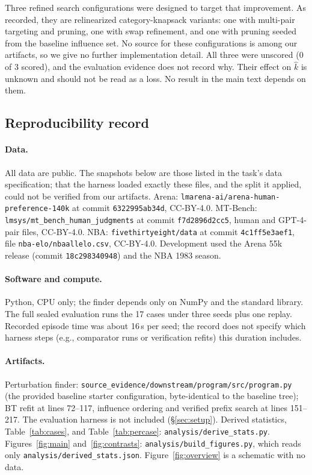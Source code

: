 \documentclass{article}
\newcommand{\kver}{\hat{k}}
\begin{document}
Three refined search configurations were designed to target that improvement. As recorded, they are relinearized category-knapsack variants: one with multi-pair targeting and pruning, one with swap refinement, and one with pruning seeded from the baseline influence set. No source for these configurations is among our artifacts, so we give no further implementation detail. All three were unscored (0 of 3 scored), and the evaluation evidence does not record why. Their effect on $\kver$ is unknown and should not be read as a loss. No result in the main text depends on them.

\subsection{Reproducibility record}
\label{app:repro}

\paragraph{Data.}
All data are public. The snapshots below are those listed in the task's data specification; that the harness loaded exactly these files, and the split it applied, could not be verified from our artifacts. Arena: \nolinkurl{lmarena-ai/arena-human-preference-140k} at commit \texttt{6322995ab34d}, CC-BY-4.0. MT-Bench: \nolinkurl{lmsys/mt_bench_human_judgments} at commit \texttt{f7d2896d2cc5}, human and GPT-4-pair files, CC-BY-4.0. NBA: \nolinkurl{fivethirtyeight/data} at commit \texttt{4c1ff5e3aef1}, file \nolinkurl{nba-elo/nbaallelo.csv}, CC-BY-4.0. Development used the Arena 55k release (commit \texttt{18c298340948}) and the NBA 1983 season.

\paragraph{Software and compute.}
Python, CPU only; the finder depends only on NumPy and the standard library. The full sealed evaluation runs the 17 cases under three seeds plus one replay. Recorded episode time was about 16\,s per seed; the record does not specify which harness steps (e.g., comparator runs or verification refits) this duration includes.

\paragraph{Artifacts.}
Perturbation finder: \nolinkurl{source_evidence/downstream/program/src/program.py} (the provided baseline starter configuration, byte-identical to the baseline tree); BT refit at lines 72--117, influence ordering and verified prefix search at lines 151--217. The evaluation harness is not included (\S\ref{sec:setup}). Derived statistics, Table~\ref{tab:cases}, and Table~\ref{tab:percase}: \nolinkurl{analysis/derive_stats.py}. Figures~\ref{fig:main} and~\ref{fig:contrasts}: \nolinkurl{analysis/build_figures.py}, which reads only \nolinkurl{analysis/derived_stats.json}. Figure~\ref{fig:overview} is a schematic with no data.
\end{document}
